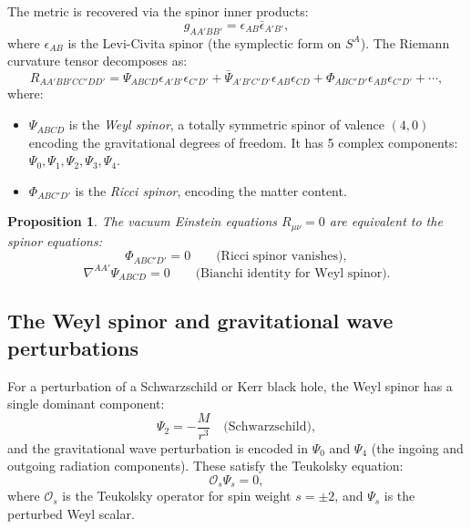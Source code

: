 \documentclass[12pt,a4paper]{article}
\newtheorem{proposition}[theorem]{Proposition}
\theoremstyle{definition}
\theoremstyle{remark}
\newcommand{\cO}{\mathcal{O}}
\begin{document}
The metric is recovered via the spinor inner products:
\begin{equation}
g_{AA'BB'} = \epsilon_{AB} \bar\epsilon_{A'B'},
\end{equation}
where $\epsilon_{AB}$ is the Levi-Civita spinor (the symplectic form on $S^A$). The Riemann curvature tensor decomposes as:
\begin{equation}
R_{AA'BB'CC'DD'} = \Psi_{ABCD} \epsilon_{A'B'} \epsilon_{C'D'} + \bar\Psi_{A'B'C'D'} \epsilon_{AB} \epsilon_{CD} + \Phi_{ABC'D'} \epsilon_{AB} \epsilon_{C'D'} + \cdots,
\end{equation}
where:
\begin{itemize}
\item $\Psi_{ABCD}$ is the \emph{Weyl spinor}, a totally symmetric spinor of valence $(4,0)$ encoding the gravitational degrees of freedom. It has 5 complex components: $\Psi_0, \Psi_1, \Psi_2, \Psi_3, \Psi_4$.
\item $\Phi_{ABC'D'}$ is the \emph{Ricci spinor}, encoding the matter content.
\end{itemize}

\begin{proposition}
\label{prop:penrose-spinor}
The vacuum Einstein equations $R_{\mu\nu} = 0$ are equivalent to the spinor equations:
\begin{equation}
\Phi_{ABC'D'} = 0 \qquad \text{(Ricci spinor vanishes)},
\end{equation}
\begin{equation}
\nabla^{AA'} \Psi_{ABCD} = 0 \qquad \text{(Bianchi identity for Weyl spinor)}.
\end{equation}
\end{proposition}

\subsection{The Weyl spinor and gravitational wave perturbations}

For a perturbation of a Schwarzschild or Kerr black hole, the Weyl spinor has a single dominant component:
\begin{equation}
\Psi_2 = -\frac{M}{r^3} \quad \text{(Schwarzschild)},
\end{equation}
and the gravitational wave perturbation is encoded in $\Psi_0$ and $\Psi_4$ (the ingoing and outgoing radiation components). These satisfy the Teukolsky equation:
\begin{equation}
\label{eq:teukolsky}
\cO_s \Psi_s = 0,
\end{equation}
where $\cO_s$ is the Teukolsky operator for spin weight $s = \pm 2$, and $\Psi_s$ is the perturbed Weyl scalar.
\end{document}
